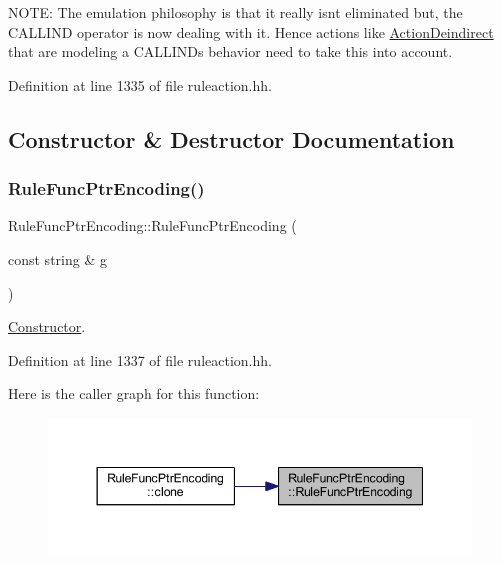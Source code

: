 N\+O\+TE\+: The emulation philosophy is that it really isn\textquotesingle{}t eliminated but, the C\+A\+L\+L\+I\+ND operator is now dealing with it. Hence actions like \mbox{\hyperlink{class_action_deindirect}{Action\+Deindirect}} that are modeling a C\+A\+L\+L\+I\+ND\textquotesingle{}s behavior need to take this into account. 

Definition at line 1335 of file ruleaction.\+hh.



\subsection{Constructor \& Destructor Documentation}
\mbox{\label{class_rule_func_ptr_encoding_ad780526b76dcbae30cfaed4ae912c914}} 
\subsubsection{\texorpdfstring{RuleFuncPtrEncoding()}{RuleFuncPtrEncoding()}}
{\footnotesize\ttfamily Rule\+Func\+Ptr\+Encoding\+::\+Rule\+Func\+Ptr\+Encoding (\begin{DoxyParamCaption}\item[{const string \&}]{g }\end{DoxyParamCaption})\hspace{0.3cm}{\ttfamily [inline]}}



\mbox{\hyperlink{class_constructor}{Constructor}}. 



Definition at line 1337 of file ruleaction.\+hh.

Here is the caller graph for this function\+:
\nopagebreak
\begin{figure}[H]
\begin{center}
\leavevmode
\includegraphics[width=344pt]{class_rule_func_ptr_encoding_ad780526b76dcbae30cfaed4ae912c914_icgraph}
\end{center}
\end{figure}


